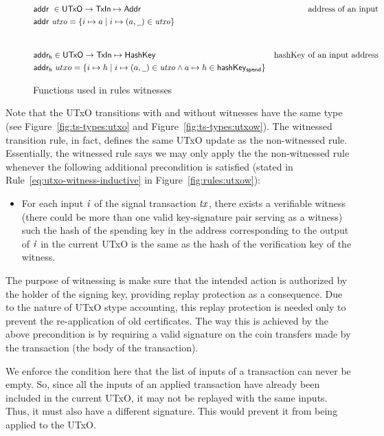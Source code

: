 \documentclass[11pt,a4paper]{article}
\newcommand{\Addr}{\type{Addr}}
\newcommand{\UTxO}{\type{UTxO}}
\newcommand{\TxIn}{\type{TxIn}}
\newcommand{\HashKey}{\type{HashKey}}
\newcommand{\addr}[1]{\fun{addr}~ \var{#1}}
\newcommand{\wcard}[0]{\underline{\phantom{a}}}
\theoremstyle{definition}
\theoremstyle{definition}
\begin{document}
\begin{figure}
  \begin{align*}
    & \addr{}{} \in \UTxO \to \TxIn \mapsto \Addr & \text{address of an input}\\
    & \addr{utxo} = \{ i \mapsto a \mid i \mapsto (a, \wcard) \in \var{utxo} \} \\
    \nextdef
    & \fun{addr_h} \in \UTxO \to \TxIn \mapsto \HashKey & \text{hashKey of an input address}\\
    & \fun{addr_h}~utxo = \{ i \mapsto h \mid i \mapsto (a, \wcard) \in \var{utxo}
      \wedge a \mapsto h \in \fun{hashKey_{spend}} \}
  \end{align*}
  \caption{Functions used in rules witnesses}
  \label{fig:derived-defs:utxow}
\end{figure}


Note that the UTxO transitions with and without witnesses have the same type
(see Figure~\ref{fig:ts-types:utxo} and Figure~\ref{fig:ts-types:utxow}).
The witnessed transition rule, in fact, defines the same UTxO update as the
non-witnessed rule. Essentially, the witnessed rule says we may only apply the
the non-witnessed rule whenever the following
additional precondition is satisfied
(stated in Rule~\ref{eq:utxo-witness-inductive} in
Figure~\ref{fig:rules:utxow}):

\begin{itemize}
 \item For each input $\mathit{i}$ of the signal transaction $\mathit{tx}$,
 there exists a verifiable witness (there could be more than one valid
 key-signature pair serving as a witness) such the hash of the spending key
 in the address corresponding to the output of $\mathit{i}$ in the current UTxO
 is the same as the hash of the verification key of the witness.
\end{itemize}

The purpose of witnessing is make sure that the intended action is authorized by
the holder of the signing key, providing replay protection as a
consequence. 
Due to the nature
of UTxO stype accounting, this replay protection is needed only to prevent
the re-application of old certificates. The way this is
achieved by the above precondition is by requiring a valid signature on
the coin transfers made by the transaction (the body of the transaction).

We enforce the condition here that the list of inputs of a transaction can never be empty.
So, since all the inputs of an applied transaction have already been included
in the current UTxO, it may not be replayed with the same inputs. Thus,
it must also have a different signature. This would prevent it from
being applied to the UTxO.
\end{document}
